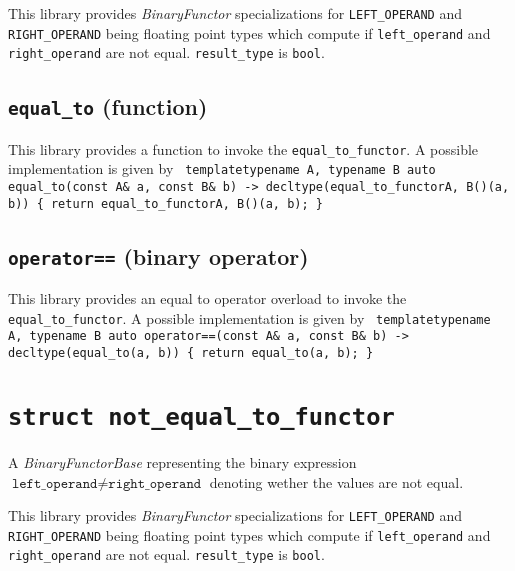 \documentclass[oneside]{book}
\begin{document}
\noindent{}This library provides \textit{BinaryFunctor}         specializations for
\texttt{LEFT\_OPERAND} and   \texttt{RIGHT\_OPERAND} being     floating point types
which compute if \texttt{left\_operand} and \texttt{right\_operand} are not  equal.
\texttt{result\_type} is \texttt{bool}.

\subsection{\texttt{equal\_to} (function)}
This library provides a function to invoke the \texttt{equal\_to\_functor}.
A possible implementation is given by\newline
\texttt{
template\textlangle typename A, typename B\textrangle\newline
auto equal\_to(const A\& a, const B\& b)\newline
-> decltype(equal\_to\_functor\textlangle A, B\textrangle()(a, b))\newline
\{ return equal\_to\_functor\textlangle A, B\textrangle()(a, b); \}
}

\subsection{\texttt{operator==} (binary operator)}
This library provides an equal to operator overload to invoke the \texttt{equal\_to\_functor}.
A possible implementation is given by\newline
\texttt{
template\textlangle typename A, typename B\textrangle\newline
auto operator==(const A\& a, const B\& b)\newline
-> decltype(equal\_to(a, b))\newline
\{ return equal\_to(a, b); \}
}

\section{\texttt{struct not\_equal\_to\_functor}}
A \textit{BinaryFunctorBase} representing the binary expression
$\texttt{left\_operand} \neq \texttt{right\_operand}$
denoting wether the values are not equal.\newline

\noindent{}This library provides \textit{BinaryFunctor}         specializations for
\texttt{LEFT\_OPERAND} and   \texttt{RIGHT\_OPERAND} being     floating point types
which compute if \texttt{left\_operand} and \texttt{right\_operand} are not  equal.
\texttt{result\_type} is \texttt{bool}.
\end{document}
